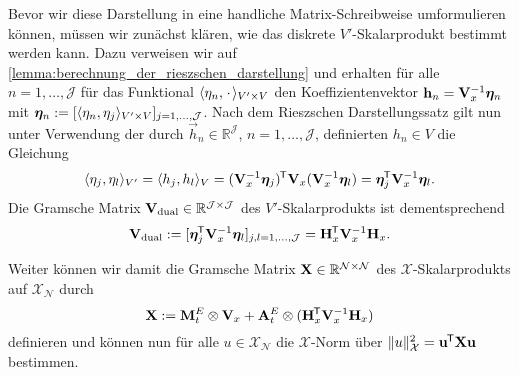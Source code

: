 \documentclass[../main.tex]{subfiles}
\begin{document}
Bevor wir diese Darstellung in eine handliche Matrix-Schreibweise umformulieren können, müssen wir zunächst klären, wie das diskrete $V'$-Skalarprodukt bestimmt werden kann.
Dazu verweisen wir auf \cref{lemma:berechnung_der_rieszschen_darstellung} und erhalten für alle $n = 1, \dots, \mathcal J$ für das Funktional $\langle\eta_{n},{\mkern2mu\cdot\mkern2mu}\rangle_{V' \times V}$ den Koeffizientenvektor $\mathbf{h}_{n} = \mathbf{V}_{x}^{-1} \bm \eta_{n}$ mit $\bm \eta_{n} := [\langle\eta_{n},\eta_{j}\rangle_{V' \times V}]_{j = 1, \dots, \mathcal J}$.
Nach dem Rieszschen Darstellungssatz gilt nun unter Verwendung der durch $\vec{h}_{n} \in \mathbb{R}^{\mathcal J}$, $n = 1, \dots, \mathcal J$, definierten $h_n \in V$ die Gleichung
\begin{equation}
    \langle\eta_{j},\eta_{l}\rangle_{V'} = \langle h_{j},h_{l}\rangle_{V} = (\mathbf{V}_{x}^{-1} \bm \eta_{j})^{\mkern-1.5mu\mathsf{T}} \mathbf{V}_{x} (\mathbf{V}_{x}^{-1} \bm \eta_{l}) = \bm{\eta}_{j}^{\mkern-1.5mu\mathsf{T}} \mathbf{V}_{x}^{-1} \bm{\eta}_{l}.
\end{equation}
Die Gramsche Matrix $\mathbf{V}_{\mathrm{dual}} \in \mathbb{R}^{\mathcal J \times \mathcal J}$ des $V'$-Skalarprodukts ist dementsprechend
\begin{equation}
    \mathbf{V}_{\mathrm{dual}} := [\bm{\eta}_{j}^{\mkern-1.5mu\mathsf{T}} \mathbf{V}_{x}^{-1} \bm{\eta}_{l}]_{j,l = 1, \dots, \mathcal J} = \mathbf{H}_{x}^{\mkern-1.5mu\mathsf{T}} \mathbf{V}_{x}^{-1} \mathbf{H}_{x}.
\end{equation}

Weiter können wir damit die Gramsche Matrix $\mathbf{X} \in \mathbb{R}^{\mathcal N \times \mathcal N}$ des $\mathcal X$-Skalarprodukts auf $\mathcal X_{\mathcal N}$ durch
\begin{equation}
    \mathbf{X} := \mathbf{M}^{E}_{t} \otimes \mathbf{V}_{x} + \mathbf{A}^{E}_{t} \otimes (\mathbf{H}_{x}^{\mkern-1.5mu\mathsf{T}} \mathbf{V}_{x}^{-1} \mathbf{H}_{x})
\end{equation}
definieren und können nun für alle $u \in \mathcal X_{\mathcal N}$ die $\mathcal X$-Norm über $\lVert u\rVert_{\mathcal X}^{2} = \mathbf{u}^{\mkern-1.5mu\mathsf{T}} \mathbf{X} \mathbf{u}$ bestimmen.
\end{document}
